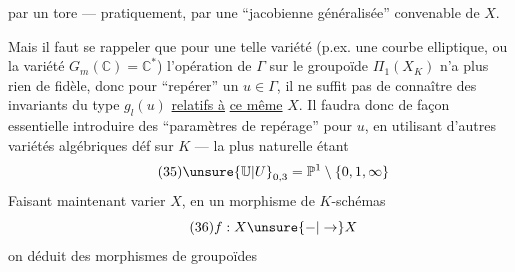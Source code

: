 par un tore --- pratiquement, par une ``jacobienne généralisée'' convenable de $X$.

Mais il faut se rappeler que pour une telle variété (p.ex. une courbe elliptique, ou la variété $G_m(\mathbb C)=\mathbb C^*$) l'opération de $\Gamma$ sur le groupoïde $\Pi_1(X_K)$ n'a plus rien de fidèle, donc pour ``repérer'' un $u\in\Gamma$, il ne suffit pas de connaître des invariants du type $g_l(u)$ \uline{relatifs à} \uline{ce même} $X$. Il faudra donc de façon essentielle introduire des ``paramètres de repérage'' pour $u$, en utilisant d'autres variétés algébriques déf sur $K$ --- la plus naturelle étant
\[
\tag{35}\unsure{\mathbb U|U}_{0,3}=\mathbb P^1\setminus\{0,1,\infty\}
\]
Faisant maintenant varier $X$, en  un morphisme de $K$-schémas
\[
\tag{36}f:X\unsure{\mathbin{-}|\to}X
\]
on déduit des morphismes de groupoïdes
